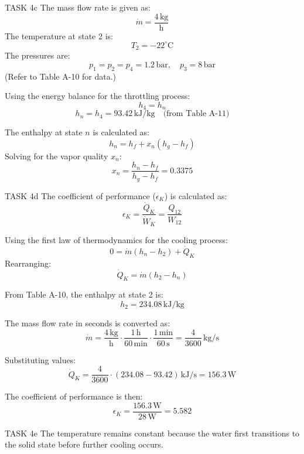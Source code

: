 TASK 4c  
The mass flow rate is given as:  
\[
\dot{m} = \frac{4 \, \text{kg}}{\text{h}}
\]  
The temperature at state 2 is:  
\[
T_2 = -22^\circ \text{C}
\]  
The pressures are:  
\[
p_1 = p_2 = p_4 = 1.2 \, \text{bar}, \quad p_3 = 8 \, \text{bar}
\]  
(Refer to Table A-10 for data.)  

Using the energy balance for the throttling process:  
\[
h_4 = h_n
\]  
\[
h_n = h_4 = 93.42 \, \text{kJ/kg} \quad \text{(from Table A-11)}
\]  

The enthalpy at state \( n \) is calculated as:  
\[
h_n = h_f + x_n (h_g - h_f)
\]  
Solving for the vapor quality \( x_n \):  
\[
x_n = \frac{h_n - h_f}{h_g - h_f} = 0.3375
\]  

TASK 4d  
The coefficient of performance (\( \epsilon_K \)) is calculated as:  
\[
\epsilon_K = \frac{\dot{Q}_K}{\dot{W}_K} = \frac{Q_{12}}{W_{12}}
\]  

Using the first law of thermodynamics for the cooling process:  
\[
0 = \dot{m} (h_n - h_2) + \dot{Q}_K
\]  
Rearranging:  
\[
\dot{Q}_K = \dot{m} (h_2 - h_n)
\]  

From Table A-10, the enthalpy at state 2 is:  
\[
h_2 = 234.08 \, \text{kJ/kg}
\]  

The mass flow rate in seconds is converted as:  
\[
\dot{m} = \frac{4 \, \text{kg}}{\text{h}} \cdot \frac{1 \, \text{h}}{60 \, \text{min}} \cdot \frac{1 \, \text{min}}{60 \, \text{s}} = \frac{4}{3600} \, \text{kg/s}
\]  

Substituting values:  
\[
\dot{Q}_K = \frac{4}{3600} \cdot (234.08 - 93.42) \, \text{kJ/s} = 156.3 \, \text{W}
\]  

The coefficient of performance is then:  
\[
\epsilon_K = \frac{156.3 \, \text{W}}{28 \, \text{W}} = 5.582
\]  

TASK 4e  
The temperature remains constant because the water first transitions to the solid state before further cooling occurs.